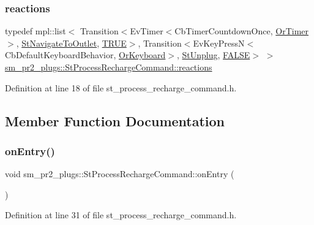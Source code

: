 \subsubsection{\texorpdfstring{reactions}{reactions}}
{\footnotesize\ttfamily typedef mpl\+::list$<$ Transition$<$Ev\+Timer$<$Cb\+Timer\+Countdown\+Once, \hyperlink{classsm__pr2__plugs_1_1OrTimer}{Or\+Timer}$>$, \hyperlink{structsm__pr2__plugs_1_1StNavigateToOutlet}{St\+Navigate\+To\+Outlet}, \hyperlink{structsm__pr2__plugs_1_1StProcessRechargeCommand_1_1TRUE}{T\+R\+UE}$>$, Transition$<$Ev\+Key\+PressN$<$Cb\+Default\+Keyboard\+Behavior, \hyperlink{classsm__pr2__plugs_1_1OrKeyboard}{Or\+Keyboard}$>$, \hyperlink{structsm__pr2__plugs_1_1StUnplug}{St\+Unplug}, \hyperlink{structsm__pr2__plugs_1_1StProcessRechargeCommand_1_1FALSE}{F\+A\+L\+SE}$>$ $>$ \hyperlink{structsm__pr2__plugs_1_1StProcessRechargeCommand_a97c8363f0989dc9dabc36a20445ba569}{sm\+\_\+pr2\+\_\+plugs\+::\+St\+Process\+Recharge\+Command\+::reactions}}



Definition at line 18 of file st\+\_\+process\+\_\+recharge\+\_\+command.\+h.



\subsection{Member Function Documentation}
\mbox{\label{structsm__pr2__plugs_1_1StProcessRechargeCommand_af8f1fc7f15100696558854bbcdc9d56e}} 
\subsubsection{\texorpdfstring{on\+Entry()}{onEntry()}}
{\footnotesize\ttfamily void sm\+\_\+pr2\+\_\+plugs\+::\+St\+Process\+Recharge\+Command\+::on\+Entry (\begin{DoxyParamCaption}{ }\end{DoxyParamCaption})\hspace{0.3cm}{\ttfamily [inline]}}



Definition at line 31 of file st\+\_\+process\+\_\+recharge\+\_\+command.\+h.


